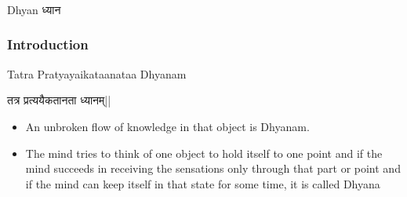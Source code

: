 \begin{frame}[fragile]\frametitle{}
\begin{center}
{\Large Dhyan ध्यान}
\end{center}
\end{frame}


\begin{frame}[fragile]\frametitle{Introduction}

Tatra Pratyayaikataanataa Dhyanam

तत्र प्रत्ययैकतानता ध्यानम्||

	\begin{itemize}
	\item An  unbroken  flow  of 
knowledge  in  that  object  is 
Dhyanam.  
\item The  mind  tries  to 
think  of  one  object  to  hold 
itself  to  one  point  and  if  the 
mind  succeeds  in  receiving 
the  sensations  only  through 
that  part  or  point    and  if  the 
mind  can  keep  itself  in  that 
state  for  some  time,  it  is 
called Dhyana
	\end{itemize}

\end{frame}



